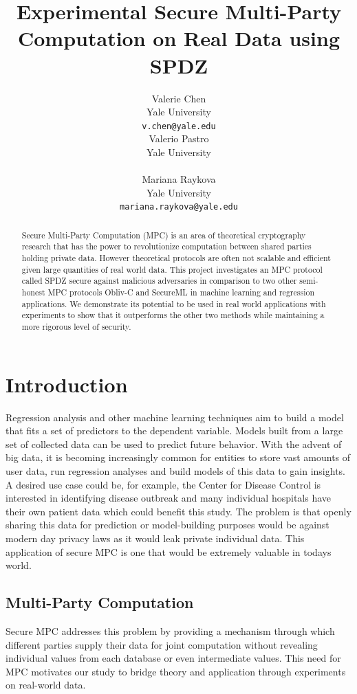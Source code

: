 \documentclass{article}
\title{Experimental Secure Multi-Party Computation on Real Data using SPDZ}
\author{}
\author{
  Valerie Chen\\
  Yale University\\
  \texttt{v.chen@yale.edu} \\
  \And
  Valerio Pastro\\
  Yale University\\
  \textt{valerio.pastro@yale.edu}\\
  \And
  Mariana Raykova \\
  Yale University \\
  \texttt{mariana.raykova@yale.edu} \\
}
\begin{document}
\maketitle
\begin{abstract}
  Secure Multi-Party Computation (MPC) is an area of theoretical cryptography research that has the power to revolutionize computation between shared parties holding private data. However theoretical protocols are often not scalable and efficient given large quantities of real world data. This project investigates an MPC protocol called SPDZ secure against malicious adversaries in comparison to two other semi-honest MPC protocols Obliv-C and SecureML in machine learning and regression applications. We demonstrate its potential to be used in real world applications with experiments to show that it outperforms the other two methods while maintaining a more rigorous level of security.
\end{abstract}

\section{Introduction}

Regression analysis and other machine learning techniques aim to build a model that fits a set of predictors to the dependent variable. Models built from a large set of collected data can be used to predict future behavior. With the advent of big data, it is becoming increasingly common for entities to store vast amounts of user data, run regression analyses and build models of this data to gain insights. A desired use case could be, for example, the Center for Disease Control is interested in identifying disease outbreak and many individual hospitals have their own patient data which could benefit this study. The problem is that openly sharing this data for prediction or model-building purposes would be against modern day privacy laws as it would leak private individual data. This application of secure MPC is one that would be extremely valuable in today\textquotesingle s world.

\subsection{Multi-Party Computation}

Secure MPC addresses this problem by providing a mechanism through which different parties supply their data for joint computation without revealing individual values from each database or even intermediate values. This need for MPC motivates our study to bridge theory and application through experiments on real-world data. 
\end{document}
